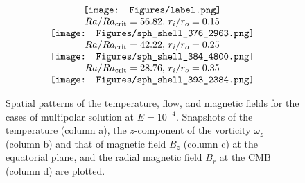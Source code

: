 \begin{figure*}
\begin{center}
\[
\begin{array}{c}
 \texttt{[image: Figures/label.png]} \\
 \mbox{$Ra / Ra_{\rm crit} = 56.82$, $r_{i} / r_{o} = 0.15$} \\
 \texttt{[image: Figures/sph\_shell\_376\_2963.png]} \\
 \mbox{$Ra / Ra_{\rm crit} = 42.22$, $r_{i} / r_{o} = 0.25$} \\
 \texttt{[image: Figures/sph\_shell\_384\_4800.png]} \\
 \mbox{$Ra / Ra_{\rm crit} = 28.76$, $r_{i} / r_{o} = 0.35$} \\
 \texttt{[image: Figures/sph\_shell\_393\_2384.png]}
\end{array}
\]
\end{center}
\caption{Spatial patterns of the temperature, flow,  and magnetic fields for the cases of multipolar solution at $E = 10^{-4}$. 
Snapshots of the temperature (column a), the $z$-component of the vorticity $\omega_{z}$ (column b) and that of magnetic field $B_{z}$ (column c) at the equatorial plane, and the radial magnetic field $B_{r}$ at the CMB (column d) are plotted.
}
\label{fig:Snap_non_dipoler_E1-4}
\end{figure*}
